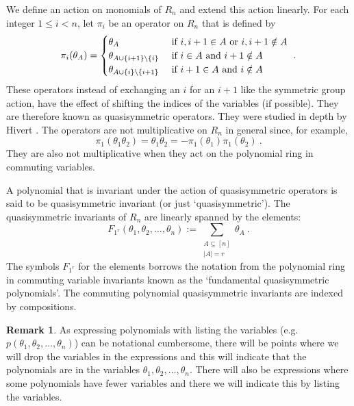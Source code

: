 \documentclass[11pt]{amsart}
\theoremstyle{definition}
\newtheorem{remark}[theorem]{Remark}
\numberwithin{equation}{section}
\begin{document}
We define an action on monomials of $R_n$ and extend this action linearly.
For each integer $1 \leq i < n$, let $\pi_i$ be an operator on $R_n$
that is defined by
\begin{equation}\label{eq:pi}
\pi_i(\theta_A) = \begin{cases}
\theta_{A} & \hbox{ if } i, i+1 \in A\hbox{ or }i, i+1 \notin A\\
\theta_{A \cup \{i+1\} \backslash \{i\}} & \hbox{ if } i\in A\hbox{ and }i+1 \notin A\\
\theta_{A \cup \{i\} \backslash \{i+1\}} & \hbox{ if } i+1\in A\hbox{ and }i \notin A
\end{cases}~.
\end{equation}
These operators instead of exchanging an $i$ for an $i+1$ like the symmetric group
action, have the effect of shifting the indices of the variables (if possible).  They
are therefore known as quasisymmetric operators.  They were studied in depth by
Hivert \cite{Hi}.  The operators are not multiplicative on $R_n$ in general since, for example,
\[
\pi_1( \theta_{1} \theta_{2})
= \theta_1 \theta_2
= - \pi_1( \theta_{1}) \pi_1(\theta_{2})~.
\]
They are also not multiplicative when they act on the polynomial ring
in commuting variables.

A polynomial that is invariant under the action of quasisymmetric operators
is said to be quasisymmetric invariant (or just `quasisymmetric').
The quasisymmetric invariants of $R_n$ are
linearly spanned by the elements:
\begin{equation}\label{eq:defF}
F_{1^r}(\theta_1, \theta_2, \ldots, \theta_n) := \sum_{\substack{A \subseteq [n]\\|A|=r}} \theta_A~.
\end{equation}
The symbols $F_{1^r}$ for the elements borrows the notation from the
polynomial ring in commuting variable invariants known as the `fundamental
quasisymmetric polynomials'.  The commuting polynomial quasisymmetric
invariants are indexed by compositions.

\begin{remark}
As expressing polynomials with listing the variables
(e.g. $p(\theta_1, \theta_2, \ldots, \theta_n)$) can be notational cumbersome,
there will be points where we will drop the variables in the expressions
and this will indicate that the polynomials are in the
variables $\theta_1, \theta_2, \ldots, \theta_n$.  There will also
be expressions where some polynomials have fewer variables and there
we will indicate this by listing the variables.
\end{remark}
\end{document}
